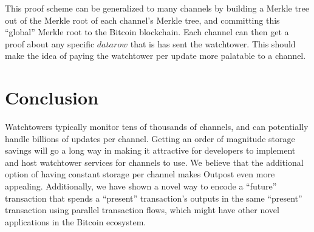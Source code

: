 This proof scheme can be generalized to many channels by building a Merkle tree out of the Merkle root of each channel's Merkle tree, and committing this ``global'' Merkle root to the Bitcoin blockchain. Each channel can then get a proof about any specific $\mathit{datarow}$ that is has sent the watchtower. This should make the idea of paying the watchtower per update more palatable to a channel.

\section{Conclusion}
Watchtowers typically monitor tens of thousands of channels, and can potentially handle billions of updates per channel. Getting an order of magnitude storage savings will go a long way in making it attractive for developers to implement and host watchtower services for channels to use. We believe that the additional option of having constant storage per channel makes Outpost even more appealing. Additionally, we have shown a novel way to encode a ``future'' transaction that spends a ``present'' transaction's outputs in the same ``present'' transaction using parallel transaction flows, which might have other novel applications in the Bitcoin ecosystem. 
